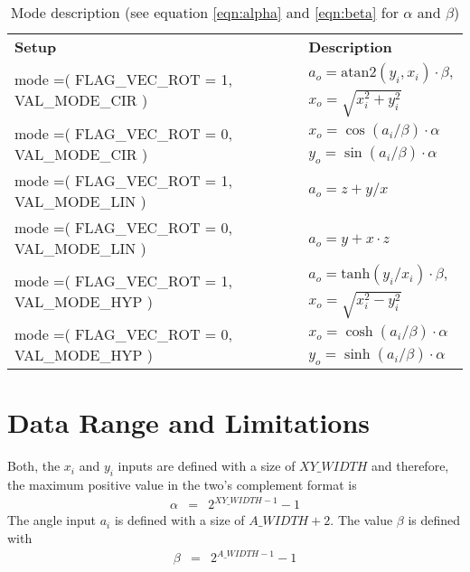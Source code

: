 \documentclass[a4paper, 12pt, notitlepage]{report}
\begin{document}
\begin{table}[htbp]
   \center
   \begin{tabular}{@{}ll@{}}
      \rowcolor{tableheadcolor}\textbf{Setup}& \textbf{Description} \\

      \multirow{2}{*}{mode =( FLAG\_VEC\_ROT = 1, VAL\_MODE\_CIR ) } & $a_o = \textrm{atan2}( y_i, x_i ) \cdot \beta,  $\\
                                                                     & $x_o = \sqrt{ x_i^2+y_i^2 }  $ \\\midrule 
      \multirow{2}{*}{mode =( FLAG\_VEC\_ROT = 0, VAL\_MODE\_CIR ) } & $x_o = \cos( a_i / \beta ) \cdot \alpha  $\\
                                                                     & $y_o = \sin( a_i / \beta ) \cdot \alpha  $\\\midrule 
      \multirow{1}{*}{mode =( FLAG\_VEC\_ROT = 1, VAL\_MODE\_LIN ) } & $a_o = z + y/x $\\\midrule
      \multirow{1}{*}{mode =( FLAG\_VEC\_ROT = 0, VAL\_MODE\_LIN ) } & $a_o = y + x\cdot z  $ $  $\\\midrule
      \multirow{2}{*}{mode =( FLAG\_VEC\_ROT = 1, VAL\_MODE\_HYP ) } & $a_o = \textrm{tanh}( y_i / x_i ) \cdot \beta,   $\\
                                                                     & $x_o = \sqrt{ x_i^2-y_i^2 }                                 $\\\midrule 
      \multirow{2}{*}{mode =( FLAG\_VEC\_ROT = 0, VAL\_MODE\_HYP ) } & $x_o = \cosh( a_i / \beta ) \cdot \alpha$\\
                                                                     & $y_o = \sinh( a_i / \beta ) \cdot \alpha$\\
      \bottomrule
   \end{tabular}
   \caption{Mode description (see equation \ref{eqn:alpha} and \ref{eqn:beta} for $\alpha$ and $\beta$)}
   \label{tab:modes}
\end{table} 


\section{Data Range and Limitations}

   Both, the $x_i$ and $y_i$ inputs are defined with a size of $XY\_WIDTH$ and therefore,
   the maximum positive value in the two's complement format is
   \begin{eqnarray}
   \alpha & = & 2^{XY\_WIDTH-1}-1
   \label{eqn:alpha}
   \end{eqnarray}
   The angle input $a_i$ is defined with a size of $A\_WIDTH+2$.
   The value $\beta$ is defined with
   \begin{eqnarray}
   \beta & = & 2^{A\_WIDTH-1} -1
   \label{eqn:beta}
   \end{eqnarray}
\end{document}

